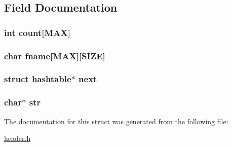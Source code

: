\subsection{Field Documentation}
\hypertarget{structhashtable_a6783739354533638166680b34941688e}{
\subsubsection[{count}]{\setlength{\rightskip}{0pt plus 5cm}int count\mbox{[}{\bf M\-A\-X}\mbox{]}}}\label{structhashtable_a6783739354533638166680b34941688e}
\hypertarget{structhashtable_a67c3266840f809ad8d273fba5a3877e1}{
\subsubsection[{fname}]{\setlength{\rightskip}{0pt plus 5cm}char fname\mbox{[}{\bf M\-A\-X}\mbox{]}\mbox{[}{\bf S\-I\-Z\-E}\mbox{]}}}\label{structhashtable_a67c3266840f809ad8d273fba5a3877e1}
\hypertarget{structhashtable_ab92122bd1cbadecf65004ab09fc458ee}{
\subsubsection[{next}]{\setlength{\rightskip}{0pt plus 5cm}struct {\bf hashtable}$\ast$ next}}\label{structhashtable_ab92122bd1cbadecf65004ab09fc458ee}
\hypertarget{structhashtable_ab50d783982593ef993ea0b68f7ad8b80}{
\subsubsection[{str}]{\setlength{\rightskip}{0pt plus 5cm}char$\ast$ str}}\label{structhashtable_ab50d783982593ef993ea0b68f7ad8b80}


The documentation for this struct was generated from the following file\-:\begin{DoxyCompactItemize}
\item 
\hyperlink{header_8h}{header.\-h}\end{DoxyCompactItemize}
